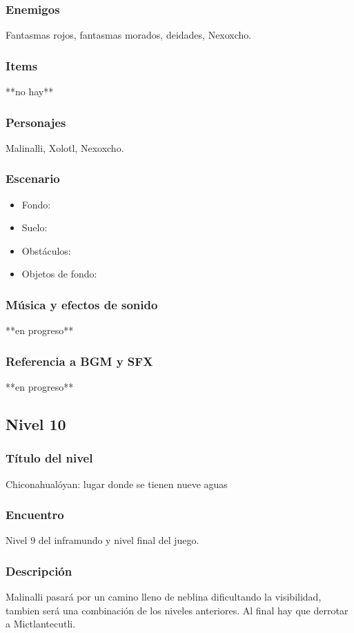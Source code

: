 \documentclass[11pt,letterpaper]{article}
\begin{document}
	\subsubsection{Enemigos}
	Fantasmas rojos, fantasmas morados, deidades, Nexoxcho.
	\subsubsection{Items}
	**no hay**
	\subsubsection{Personajes}
	Malinalli, Xolotl, Nexoxcho.
	\subsubsection{Escenario}
\begin{itemize} 
	\item Fondo:
	\item Suelo:
	\item Obstáculos:
	\item Objetos de fondo:
\end{itemize}	
	\subsubsection{Música y efectos de sonido}
	**en progreso**
	\subsubsection{Referencia a BGM y SFX}
	**en progreso**
	
	
		\subsection{Nivel 10}
	\subsubsection{Título del nivel}
	Chiconahualóyan: lugar donde se tienen nueve aguas
	\subsubsection{Encuentro}
	Nivel 9 del inframundo y nivel final del juego.
	\subsubsection{Descripción}
	Malinalli pasará por un camino lleno de neblina dificultando la visibilidad, tambien será una combinación de los niveles anteriores. Al final hay que derrotar a Mictlantecutli.
\end{document}
